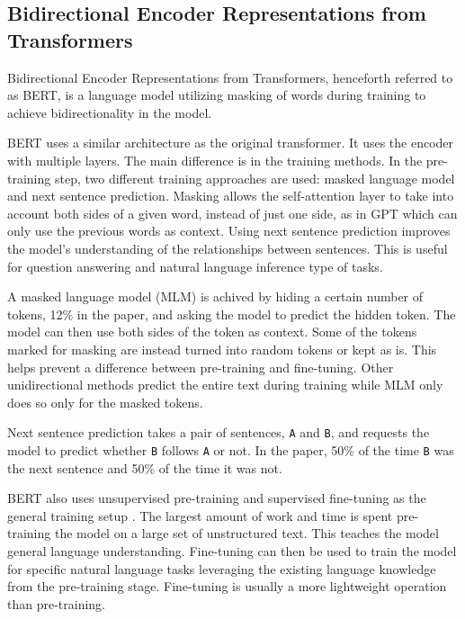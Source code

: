 \documentclass[twoside]{article}
\begin{document}
\subsection{Bidirectional Encoder Representations from Transformers}
Bidirectional Encoder Representations from Transformers, henceforth referred to as BERT,
is a language model utilizing masking of words during training to achieve bidirectionality
in the model. \cite{devlin_bert_2019}

BERT uses a similar architecture as the original transformer. It uses the encoder with
multiple layers. The main difference is in the training methods. In the pre-training step,
two different training approaches are used: masked language model and next sentence prediction.
Masking allows the self-attention layer to take into account both sides of a given word, instead
of just one side, as in GPT which can only use the previous words as context. Using next sentence
prediction improves the model's understanding of the relationships between sentences. This is
useful for question answering and natural language inference type of tasks. \cite{devlin_bert_2019}

A masked language model (MLM) is achived by hiding a certain number of tokens, 12\% in the paper, and
asking the model to predict the hidden token. The model can then use both sides of the token as
context. Some of the tokens marked for masking are instead turned 
into random tokens or kept as is. This helps prevent a difference between pre-training and fine-tuning.
Other unidirectional methods predict the entire text during training while MLM only 
does so only for the masked tokens. \cite{devlin_bert_2019}

Next sentence prediction takes a pair of sentences, \texttt{A} and \texttt{B}, and requests the model
to predict whether \texttt{B} follows \texttt{A} or not. In the paper, 50\% of the time \texttt{B} 
was the next sentence and 50\% of the time it was not. \cite{devlin_bert_2019}

BERT also uses unsupervised pre-training and supervised fine-tuning as the general training setup \cite{devlin_bert_2019}.
The largest amount of work and time is spent pre-training the model on a large set of unstructured
text. This teaches the model general language understanding. Fine-tuning can then be used to 
train the model for specific natural language tasks leveraging the existing language knowledge 
from the pre-training stage. Fine-tuning is usually a more lightweight operation than pre-training.
\end{document}
